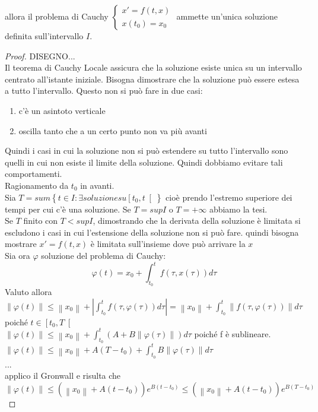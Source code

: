 allora il problema di Cauchy $\left\{\begin{matrix} x'=f(t,x)\\x(t_0)=x_0\end{matrix}\right.$ ammette un'unica soluzione definita sull'intervallo $I$.
\begin{proof}
	DISEGNO...\\
	Il teorema di Cauchy Locale assicura che  la soluzione esiste unica su un intervallo centrato all'istante iniziale.
	Bisogna dimostrare che la soluzione può essere estesa a tutto l'intervallo. Questo non si può fare in due casi:
	\begin{enumerate}
		\item c'è un asintoto verticale
		\item oscilla tanto che a un certo punto non va più avanti
	\end{enumerate}
	Quindi i casi in cui la soluzione non si può estendere su tutto l'intervallo sono quelli in cui non esiste il limite della soluzione. Quindi dobbiamo evitare tali comportamenti.\\
	Ragionamento da $t_0$ in avanti.\\
	Sia $T=sum\left\{t\in I :\exists soluzione su \left[ t_0,t \right[ \right\}$ cioè prendo l'estremo superiore dei tempi per cui c'è una soluzione.
	Se $T= sup I$ o $T=+\infty$ abbiamo la tesi.\\
	Se $T$ finito con $T<sup I$, dimostrando che la derivata della soluzione è limitata si escludono i casi in cui l'estensione della soluzione non si può fare.
	quindi bisogna mostrare $ x' = f(t,x)$ è limitata sull'insieme dove può arrivare la $x$\\
	Sia ora $\varphi$ soluzione del problema di Cauchy:
	$$ \varphi(t) = x_0 + \int_{t_0}^tf(\tau,x(\tau))d\tau$$
	Valuto allora\\
	$\left\|\varphi(t)\right\|\le \left\|x_0\right\| + \left|\int_{t_0}^tf(\tau,\varphi(\tau))d\tau\right|=\left\|x_0\right\| + \int_{t_0}^t\left\|f(\tau,\varphi(\tau))\right\|d\tau$ poiché $t\in\left[t_0,T\right[$\\
	$\left\|\varphi(t)\right\|\le \left\|x_0\right\| + \int_{t_0}^t\left(A+B\left\|\varphi(\tau)\right\|\right)d\tau$ poiché f è sublineare.\\
	$\left\|\varphi(t)\right\|\le \left\|x_0\right\| + A(T-t_0)+\int_{t_0}^t B\left\|\varphi(\tau)\right\|d\tau$\\
	...\\
	applico il Gronwall e risulta che
	$$\left\|\varphi(t)\right\|\le\left(\left\|x_0\right\|+A(t-t_0)\right)e^{B(t-t_0)}\le\left(\left\|x_0\right\|+A(t-t_0)\right)e^{B(T-t_0)}$$	

\end{proof}

